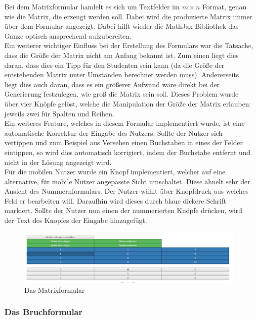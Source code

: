Bei dem Matrixformular handelt es sich um Textfelder im $ m\times n$ Format, genau wie die Matrix, die erzeugt werden soll. Dabei wird die produzierte Matrix immer über dem Formular angezeigt. Dabei hilft wieder die MathJax Bibliothek das Ganze optisch ansprechend aufzubereiten. \\

Ein weiterer wichtiger Einfluss bei der Erstellung des Formulars war die Tatsache, dass die Größe der Matrix nicht am Anfang bekannt ist. Zum einen liegt dies daran, dass dies ein Tipp für den Studenten sein kann (da die Größe der entstehenden Matrix unter Umständen berechnet werden muss). Andererseits liegt dies auch daran, dass es ein größerer Aufwand wäre direkt bei der Generierung festzulegen, wie groß die Matrix sein soll. Dieses Problem wurde über vier Knöpfe gelöst, welche die Manipulation der Größe der Matrix erlauben: jeweils zwei für Spalten und Reihen. \\

Ein weiteres Feature, welches in diesem Formular implementiert wurde, ist eine automatische Korrektur der Eingabe des Nutzers. Sollte der Nutzer sich vertippen und zum Beispiel aus Versehen einen Buchstaben in eines der Felder eintippen, so wird dies automatisch korrigiert, indem der Buchstabe entfernt und nicht in der Lösung angezeigt wird. \\

Für die mobilen Nutzer wurde ein Knopf implementiert, welcher auf eine alternative, für mobile Nutzer angepasste Sicht umschaltet. Diese ähnelt sehr der Ansicht des Nummernformulars. Der Nutzer wählt über Knopfdruck aus welches Feld er bearbeiten will. Daraufhin wird dieses durch blaue dickere Schrift markiert. Sollte der Nutzer nun einen der nummerierten Knöpfe drücken, wird der Text des Knopfes der Eingabe hinzugefügt.


\begin{figure}[htp]     %
\centering
\includegraphics[width=1\textwidth]{bilder/MatrixMobile} 
\caption[Das Matrixformular]{Das Matrixformular}
\end{figure} 


\subsubsection{Das Bruchformular}

